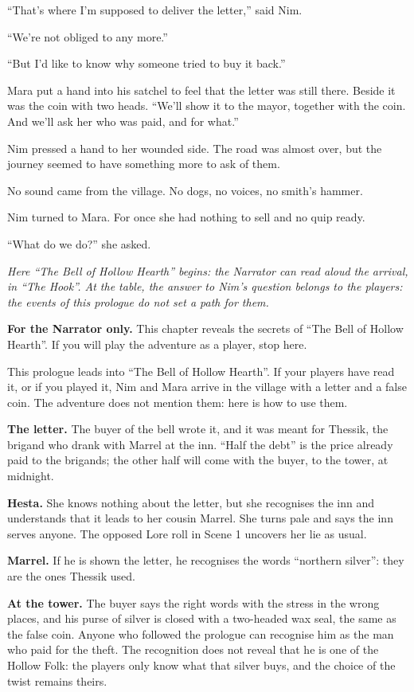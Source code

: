 \documentclass[10pt,a4paper]{article}
\begin{document}
“That's where I'm supposed to deliver the letter,” said Nim.

“We're not obliged to any more.”

“But I'd like to know why someone tried to buy it back.”

Mara put a hand into his satchel to feel that the letter was still there. Beside it was the coin with two heads. “We'll show it to the mayor, together with the coin. And we'll ask her who was paid, and for what.”

Nim pressed a hand to her wounded side. The road was almost over, but the journey seemed to have something more to ask of them.

No sound came from the village. No dogs, no voices, no smith's hammer.

Nim turned to Mara. For once she had nothing to sell and no quip ready.

“What do we do?” she asked.

\emph{Here “The Bell of Hollow Hearth” begins: the Narrator can read aloud the arrival, in “The Hook”. At the table, the answer to Nim's question belongs to the players: the events of this prologue do not set a path for them.}
\endgroup
\clearpage
{}
\begin{rpgnote}
\textbf{For the Narrator only.} This chapter reveals the secrets of “The Bell of Hollow Hearth”. If you will play the adventure as a player, stop here.
\end{rpgnote}
This prologue leads into “The Bell of Hollow Hearth”. If your players have read it, or if you played it, Nim and Mara arrive in the village with a letter and a false coin. The adventure does not mention them: here is how to use them.

\textbf{The letter.} The buyer of the bell wrote it, and it was meant for Thessik, the brigand who drank with Marrel at the inn. “Half the debt” is the price already paid to the brigands; the other half will come with the buyer, to the tower, at midnight.

\textbf{Hesta.} She knows nothing about the letter, but she recognises the inn and understands that it leads to her cousin Marrel. She turns pale and says the inn serves anyone. The opposed Lore roll in Scene 1 uncovers her lie as usual.

\textbf{Marrel.} If he is shown the letter, he recognises the words “northern silver”: they are the ones Thessik used.

\textbf{At the tower.} The buyer says the right words with the stress in the wrong places, and his purse of silver is closed with a two-headed wax seal, the same as the false coin. Anyone who followed the prologue can recognise him as the man who paid for the theft. The recognition does not reveal that he is one of the Hollow Folk: the players only know what that silver buys, and the choice of the twist remains theirs.
\end{document}
